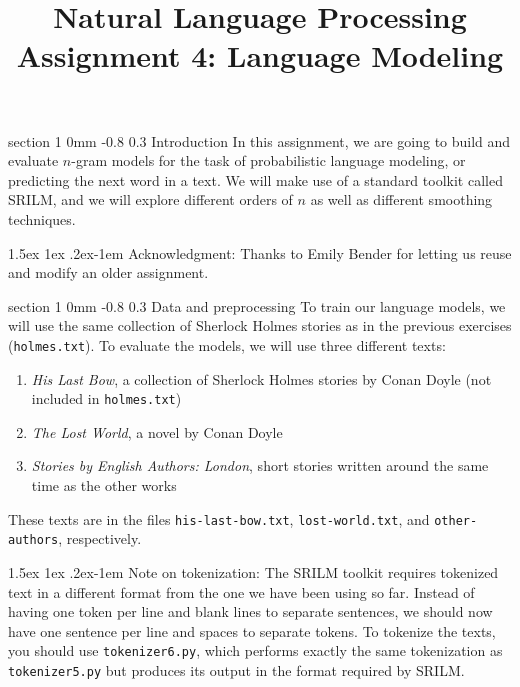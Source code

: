 \documentclass[11pt]{article}
\title{{\LARGE Natural Language Processing}\\[1.5mm]{\large Assignment 4: Language Modeling}}
\author{}
\date{} %
\makeatletter
\newcommand{\newsec}[2]{\section{#1}\label{sec:#2}\noindent}
\renewcommand{\section}{\@startsection
{section}%
{1}%
{0mm}%
{-0.8\baselineskip}%
{0.3\baselineskip}%
{\bfseries\large}}%
\renewcommand{\paragraph}{%
  \@startsection{paragraph}{4}%
  {\z@}{1.5ex \@plus 1ex \@minus .2ex}{-1em}%
  {\normalfont\normalsize\bfseries}%
}\makeatother
\makeatother
\begin{document}
 

\maketitle
\vspace{-2mm}
\newsec{Introduction}{intro}%
In this assignment, we are going to build and evaluate $n$-gram models %
for the task of probabilistic language modeling, or predicting the next word in a text. We will make use
of a standard toolkit called SRILM, and we will explore different orders of $n$ as well as different smoothing techniques. 

\paragraph{Acknowledgment:} Thanks to Emily Bender for letting us reuse
and modify an older assignment.

\newsec{Data and preprocessing}{data}%
To train our language models, we will use the same collection of Sherlock Holmes stories as in the previous exercises ({\tt holmes.txt}).
To evaluate the models, we will use three different texts:
\begin{enumerate}[noitemsep,topsep=0.2cm]
\item \emph{His Last Bow}, a collection of Sherlock Holmes stories by Conan Doyle (not included in {\tt holmes.txt})
\item \emph{The Lost World}, a novel by Conan Doyle
\item \emph{Stories by English Authors: London}, short stories written around the same time as the other works
\end{enumerate}
These texts are in the files {\tt his-last-bow.txt}, {\tt lost-world.txt}, and {\tt other-authors}, respectively.

\paragraph{Note on tokenization:} The SRILM toolkit requires tokenized text in a different format from the one we have been using so far. 
Instead of having one token per line and blank lines to separate sentences, we should now have one sentence per line and spaces to separate tokens.
To tokenize the texts, you should use {\tt tokenizer6.py}, which performs exactly the same tokenization as {\tt tokenizer5.py} but produces its 
output in the format required by SRILM.
\end{document}
